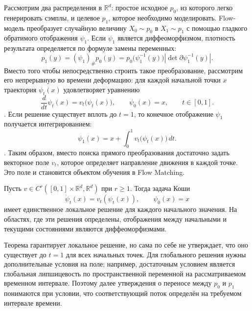 Рассмотрим два распределения в $\mathbb R^d$: простое исходное
$p_0$, из которого легко генерировать сэмплы, и целевое $p_1$, которое
необходимо моделировать. Flow-модель преобразует случайную величину
$X_0\sim p_0$ в $X_1\sim p_1$ с помощью гладкого обратимого отображения
$\psi_1$. Если $\psi_1$ является диффеоморфизмом, плотность результата
определяется по формуле замены переменных:
\[
p_1(y) = (\psi_1)_\#p_0(y)
= p_0\bigl(\psi_1^{-1}(y)\bigr)
\left|\det \partial\psi_1^{-1}(y)\right|.
\]
Вместо того чтобы непосредственно строить такое преобразование,
рассмотрим его непрерывную во времени деформацию: для каждой начальной точки
$x$ траектория $\psi_t(x)$ удовлетворяет уравнению
\[
\frac{d}{dt}\psi_t(x) = v_t\bigl(\psi_t(x)\bigr),
\qquad \psi_0(x)=x,\qquad t\in[0,1].
\].
Если решение существует вплоть до $t=1$, то конечное отображение $\psi_1$ получается
интегрированием:
\[
\psi_1(x) = x + \int_0^{1} v_t\bigl(\psi_t(x)\bigr)\,dt.
\].
Таким образом, вместо поиска прямого преобразования достаточно задать
векторное поле $v_t$, которое определяет направление движения в каждой точке.
Это поле и становится объектом обучения в Flow Matching.

\begin{theorem}
Пусть $v\in C^r([0,1]\times\mathbb R^d,\mathbb R^d)$ при $r\geq 1$.
Тогда задача Коши
\[
\dot\psi_t(x)=v_t(\psi_t(x)),\qquad \psi_0(x)=x
\]
имеет единственное локальное решение для каждого начального значения.
На областях, где эти решения определены, отображения между начальными и
текущими состояниями являются диффеоморфизмами.
\end{theorem}

Теорема гарантирует локальное решение, но сама по себе не утверждает, что
оно существует до $t=1$ для всех начальных точек. Для глобального решения
нужны дополнительные условия на поле; например, достаточным условием
является глобальная липшицевость по пространственной переменной на
рассматриваемом временном интервале. Поэтому далее утверждения о переносе
между $p_0$ и $p_1$ понимаются при условии, что соответствующий поток
определён на требуемом интервале времени.

